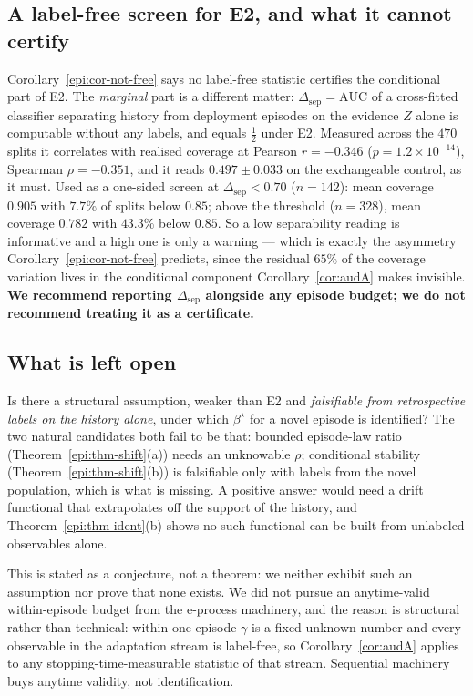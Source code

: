 \subsection{A label-free screen for E2, and what it cannot certify}

Corollary~\ref{epi:cor-not-free} says no label-free statistic certifies the conditional part of E2.
The \emph{marginal} part is a different matter: $\Delta_{\mathrm{sep}}=\mathrm{AUC}$ of a
cross-fitted classifier separating history from deployment episodes on the evidence $Z$ alone is
computable without any labels, and equals $\tfrac12$ under E2. Measured across the $470$ splits it
correlates with realised coverage at Pearson $r=-0.346$ ($p=1.2\times10^{-14}$), Spearman
$\rho=-0.351$, and it reads $0.497\pm0.033$ on the exchangeable control, as it must. Used as a
one-sided screen at $\Delta_{\mathrm{sep}}<0.70$ ($n=142$): mean coverage $0.905$ with $7.7\%$ of
splits below $0.85$; above the threshold ($n=328$), mean coverage $0.782$ with $43.3\%$ below
$0.85$. So a low separability reading is informative and a high one is only a warning --- which is
exactly the asymmetry Corollary~\ref{epi:cor-not-free} predicts, since the residual $65\%$ of the
coverage variation lives in the conditional component Corollary~\ref{cor:audA} makes invisible.
\textbf{We recommend reporting $\Delta_{\mathrm{sep}}$ alongside any episode budget; we do not
recommend treating it as a certificate.}

\subsection{What is left open}

\begin{conjecture}\label{epi:conj-open}
Is there a structural assumption, weaker than E2 and \emph{falsifiable from retrospective labels on
the history alone}, under which $\beta^\star$ for a novel episode is identified? The two natural
candidates both fail to be that: bounded episode-law ratio (Theorem~\ref{epi:thm-shift}(a)) needs an
unknowable $\rho$; conditional stability (Theorem~\ref{epi:thm-shift}(b)) is falsifiable only with
labels from the novel population, which is what is missing. A positive answer would need a drift
functional that extrapolates off the support of the history, and
Theorem~\ref{epi:thm-ident}(b) shows no such functional can be built from unlabeled observables
alone.
\end{conjecture}

\noindent This is stated as a conjecture, not a theorem: we neither exhibit such an assumption nor
prove that none exists. We did not pursue an anytime-valid within-episode budget from the e-process
machinery, and the reason is structural rather than technical: within one episode $\gamma$ is a
fixed unknown number and every observable in the adaptation stream is label-free, so
Corollary~\ref{cor:audA} applies to any stopping-time-measurable statistic of that stream.
Sequential machinery buys anytime validity, not identification.

